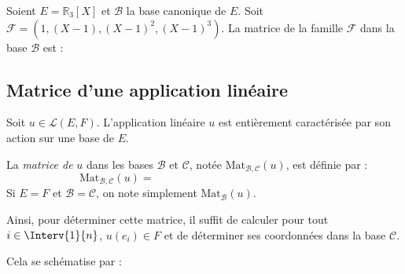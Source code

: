 \documentclass[a4paper,10pt]{report}
\begin{document}
\medskip

\begin{ex} Soient $E = \mathbb{R}_3[X]$ et $\mathcal{B}$ la base canonique de $E$. Soit $\mathcal{F}=(1,(X-1),(X-1)^2,(X-1)^3)$. La matrice de la famille $\mathcal{F}$ dans la base $\mathcal{B}$ est :

\vspace{5cm}


\end{ex}


\subsection{Matrice d'une application linéaire}

\noindent Soit $u \in \mathcal{L}(E,F)$. L'application linéaire $u$ est entièrement caractérisée par son action sur une base de $E$.

\begin{defin} La \textit{matrice de} $u$ dans les bases $\mathcal{B}$ et $\mathcal{C}$, notée $\textrm{Mat}_{\mathcal{B}, \mathcal{C}}(u)$, est définie par :
$$ \textrm{Mat}_{\mathcal{B}, \mathcal{C}}(u)= \phantom{\textrm{Mat}_{\mathcal{C}}(u(e_1), u(e_2), \ldots, u(e_n))}$$
Si $E=F$ et $\mathcal{B}= \mathcal{C}$, on note simplement $\textrm{Mat}_{\mathcal{B}}(u)$.
\end{defin}

\noindent Ainsi, pour déterminer cette matrice, il suffit de calculer pour tout $i \in \Interv{1}{n}$, $u(e_i) \in F$ et de déterminer ses coordonnées dans la base $\mathcal{C}$.


\noindent Cela se schématise par :

\end{document}
